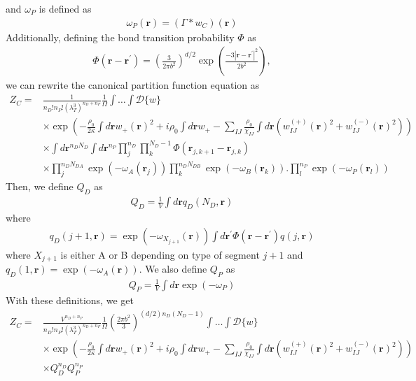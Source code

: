 \documentclass{article}
\begin{document}
and $\omega_P$ is defined as
\begin{align*}
  \omega_P(\mathbf{r}) = (\Gamma \ast w_C)(\mathbf{r})
\end{align*}
Additionally, defining the bond transition probability $\Phi$ as
\begin{align*}
  \Phi(\mathbf{r} - \mathbf{r}^\prime) =
    \left( \frac{3}{2\pi b^2} \right) ^ {d/2}
    \exp \left( \frac{-3| \mathbf{r} - \mathbf{r}^\prime |^2}{2b^2} \right),
\end{align*}
we can rewrite the canonical partition function equation as
\begin{align*}
  Z_C =& \frac{1}{n_D!n_P! \left( \lambda_T^3 \right)^{n_D+n_P}}
    \frac{1}{\Omega}
    \int \hdots \int \mathcal{D} \{w\} \\
    &\times
    \exp \left(
      - \frac{\rho_0}{2\kappa} \int d \mathbf{r} w_+(\mathbf{r})^2
      + i \rho_0 \int d\mathbf{r} w_+
      - \sum_{IJ}
      \frac{\rho_0}{\chi_{IJ}}
      \int d \mathbf{r}
      \left(
        w_{IJ}^{(+)} (\mathbf{r})^2 + w_{IJ}^{(-)} (\mathbf{r})^2
      \right)
    \right) \\
    &\times \int d \mathbf{r}^{n_DN_D} \int d \mathbf{r}^{n_P}
      \prod_j^{n_D} \prod_k^{N_D-1}
      \Phi(\mathbf{r}_{j,k+1} - \mathbf{r}_{j,k}) \\
    &\times
    \prod_{j}^{n_{D}N_{DA}} \exp \left( -\omega_A(\mathbf{r}_j) \right)
    \prod_{k}^{n_{D}N_{DB}} \exp \left( -\omega_B(\mathbf{r}_k) \right).
    \prod_{l}^{n_P}         \exp \left( -\omega_P(\mathbf{r}_l) \right)
\end{align*}
Then, we define $Q_D$ as
\begin{align*}
  Q_D = \frac{1}{V} \int d\mathbf{r} q_D (N_D, \mathbf{r})
\end{align*}
where
\begin{align*}
  q_D(j+1, \mathbf{r}) = \exp(-\omega_{X_{j+1}}(\mathbf{r}))
    \int d \mathbf{r}^\prime \Phi(\mathbf{r} - \mathbf{r}^\prime)
    q(j, \mathbf{r})
\end{align*}
where $X_{j+1}$ is either A or B depending on type of segment $j+1$
  and $q_D(1, \mathbf{r}) = \exp(-\omega_A(\mathbf{r}))$.
We also define $Q_P$ as
\begin{align*}
  Q_P = \frac{1}{V} \int d\mathbf{r} \exp (-\omega_P)
\end{align*}
With these definitions, we get
\begin{align*}
  Z_C =& \frac{V^{n_D+n_P}}
              {n_D!n_P! \left( \lambda_T^3 \right)^{n_D+n_P}}
    \frac{1}{\Omega}
    \left( \frac{2\pi b^2}{3} \right)
      ^{(d/2)n_D(N_D-1)}
    \int \hdots \int \mathcal{D} \{w\} \\
    &\times \exp \left(
      - \frac{\rho_0}{2\kappa} \int d \mathbf{r} w_+(\mathbf{r})^2
      + i \rho_0 \int d\mathbf{r} w_+
      - \sum_{IJ}
      \frac{\rho_0}{\chi_{IJ}}
      \int d \mathbf{r}
      \left(
        w_{IJ}^{(+)} (\mathbf{r})^2 + w_{IJ}^{(-)} (\mathbf{r})^2
      \right)
    \right) \\
    &\times Q_D^{n_D} Q_P^{n_P}
\end{align*}
\end{document}
